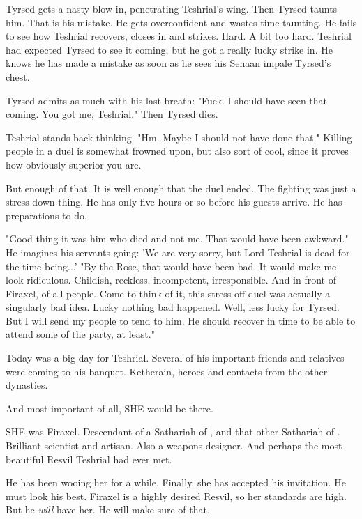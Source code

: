 Tyrsed gets a nasty blow in, penetrating Teshrial's wing. 
Then Tyrsed taunts him.
That is his mistake. 
He gets overconfident and wastes time taunting. 
He fails to see how Teshrial recovers, closes in and strikes. 
Hard. 
A bit too hard. 
Teshrial had expected Tyrsed to see it coming, but he got a really lucky strike in. 
He knows he has made a mistake as soon as he sees his Senaan impale Tyrsed's chest. 

Tyrsed admits as much with his last breath:
"Fuck. I should have seen that coming. You got me, Teshrial."
Then Tyrsed dies. 

Teshrial stands back thinking. 
"Hm. Maybe I should not have done that."
Killing people in a duel is somewhat frowned upon, but also sort of cool, since it proves how obviously superior you are. 

But enough of that. 
It is well enough that the duel ended.
The fighting was just a stress-down thing. 
He has only five hours or so before his guests arrive. 
He has preparations to do. 

"Good thing it was him who died and not me.
That would have been awkward."
He imagines his servants going: 
'We are very sorry, but Lord Teshrial is dead for the time being...'
"By the Rose, that would have been bad. 
It would make me look ridiculous. 
Childish, reckless, incompetent, irresponsible. 
And in front of Firaxel, of all people.
Come to think of it, this stress-off duel was actually a singularly bad idea.
Lucky nothing bad happened.
Well, less lucky for Tyrsed.
But I will send my people to tend to him.
He should recover in time to be able to attend some of the party, at least."

Today was a big day for Teshrial. 
Several of his important friends and relatives were coming to his banquet. 
Ketherain, heroes and contacts from the other dynasties. 

And most important of all, SHE would be there. 

SHE was Firaxel. 
Descendant of a Sathariah of \CiriathSepher, and that other Sathariah of \TiphredSerah. 
Brilliant scientist and artisan. 
Also a weapons designer. 
And perhaps the most beautiful Resvil Teshrial had ever met. 

He has been wooing her for a while. 
Finally, she has accepted his invitation. 
He must look his best. 
Firaxel is a highly desired Resvil, so her standards are high.
But he \emph{will} have her. 
He will make sure of that. 









